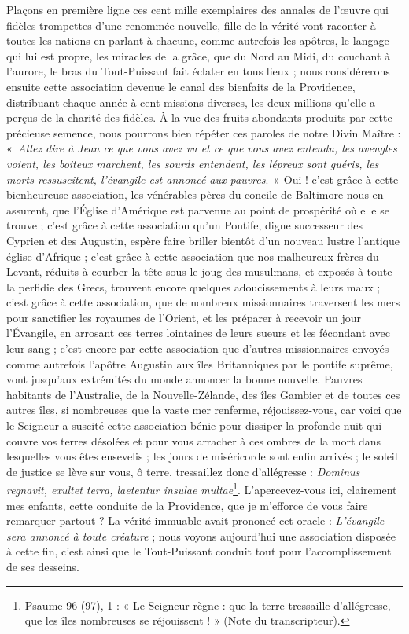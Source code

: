 \documentclass[11pt,a4paper]{report}
\begin{document}
Plaçons en première ligne ces cent mille exemplaires des annales de l'œuvre qui fidèles trompettes d'une renommée nouvelle, fille de la vérité vont raconter à toutes les nations en parlant à chacune, comme autrefois les apôtres, le langage qui lui est propre, les miracles de la grâce, que du Nord au Midi, du couchant à l'aurore, le bras du Tout-Puissant fait éclater en tous lieux ; nous considérerons ensuite cette association devenue le canal des bienfaits de la Providence, distribuant chaque année à cent missions diverses, les deux millions qu'elle a perçus de la charité des fidèles. À la vue des fruits abondants produits par cette précieuse semence, nous pourrons bien répéter ces paroles de notre Divin Maître : «~\textit{Allez dire à Jean ce que vous avez vu et ce que vous avez entendu, les aveugles voient, les boiteux marchent, les sourds entendent, les lépreux sont guéris, les morts ressuscitent, l'évangile est annoncé aux pauvres}.~» Oui ! c'est grâce à cette bienheureuse association, les vénérables pères du concile de Baltimore nous en assurent, que l'Église d'Amérique est parvenue au point de prospérité où elle se trouve ; c'est grâce à cette association qu'un Pontife, digne successeur des Cyprien et des Augustin, espère faire briller bientôt d'un nouveau lustre l'antique église d'Afrique ; c'est grâce à cette association que nos malheureux frères du Levant, réduits à courber la tête sous le joug des musulmans, et exposés à toute la perfidie des Grecs, trouvent encore quelques adoucissements à leurs maux ; c'est grâce à cette association, que de nombreux missionnaires traversent les mers pour sanctifier les royaumes de l'Orient, et les préparer à recevoir un jour l'Évangile, en arrosant ces terres lointaines de leurs sueurs et les fécondant avec leur sang ; c'est encore par cette association que d'autres missionnaires envoyés comme autrefois l'apôtre Augustin aux îles Britanniques par le pontife suprême, vont jusqu'aux extrémités du monde annoncer la bonne nouvelle. Pauvres habitants de l'Australie, de la Nouvelle-Zélande, des îles Gambier et de toutes ces autres îles, si nombreuses que la vaste mer renferme, réjouissez-vous, car voici que le Seigneur a suscité cette association bénie pour dissiper la profonde nuit qui couvre vos terres désolées et pour vous arracher à ces ombres de la mort dans lesquelles vous êtes ensevelis ; les jours de miséricorde sont enfin arrivés ; le soleil de justice se lève sur vous, ô terre, tressaillez donc d'allégresse : \textit{Dominus regnavit, exultet terra, laetentur insulae multae}\footnote{Psaume 96 (97), 1 : « Le Seigneur règne : que la terre tressaille d'allégresse, que les îles nombreuses se réjouissent ! » (Note du transcripteur).}. L'apercevez-vous ici, clairement mes enfants, cette conduite de la Providence, que je m'efforce de vous faire remarquer partout ? La vérité immuable avait prononcé cet oracle : \textit{L'évangile sera annoncé à toute créature} ; nous voyons aujourd'hui une association disposée à cette fin, c'est ainsi que le Tout-Puissant conduit tout pour l'accomplissement de ses desseins.
\end{document}
